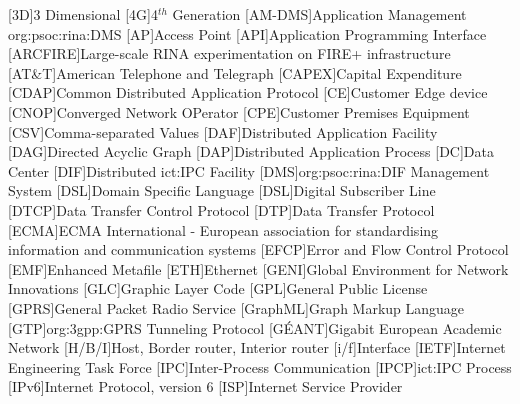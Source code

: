 \begin{acronym}[PRISTINEX]
    [3D]{3 Dimensional}
    [4G]{4$^{th}$ Generation}
    [AM-DMS]{Application Management \acs{org:psoc:rina:DMS}}
    [AP]{Access Point}
    [API]{Application Programming Interface}
    [ARCFIRE]{Large-scale RINA experimentation on FIRE+ infrastructure}
    [AT\&T]{American Telephone and Telegraph}
    [CAPEX]{Capital Expenditure}
    [CDAP]{Common Distributed Application Protocol}
    [CE]{Customer Edge device}
    [CNOP]{Converged Network OPerator}
    [CPE]{Customer Premises Equipment}
    [CSV]{Comma-separated Values}
    [DAF]{Distributed Application Facility}
    [DAG]{Directed Acyclic Graph}
    [DAP]{Distributed Application Process}
    [DC]{Data Center}
    [DIF]{Distributed \acs{ict:IPC} Facility}
    [DMS]{\acs{org:psoc:rina:DIF} Management System}
    [DSL]{Domain Specific Language}
    [DSL]{Digital Subscriber Line}
    [DTCP]{Data Transfer Control Protocol}
    [DTP]{Data Transfer Protocol}
    [ECMA]{ECMA International - European association for standardising information and communication systems}
    [EFCP]{Error and Flow Control Protocol}
    [EMF]{Enhanced Metafile}
    [ETH]{Ethernet}
    [GENI]{Global Environment for Network Innovations}
    [GLC]{Graphic Layer Code}
    [GPL]{General Public License}
    [GPRS]{General Packet Radio Service}
    [GraphML]{Graph Markup Language}
    [GTP]{\acs{org:3gpp:GPRS} Tunneling Protocol}
    [GÉANT]{Gigabit European Academic Network}
    [H/B/I]{Host, Border router, Interior router}
    [i/f]{Interface}
    [IETF]{Internet Engineering Task Force}
    [IPC]{Inter-Process Communication}
    [IPCP]{\acs{ict:IPC} Process}
    [IPv6]{Internet Protocol, version 6}
    [ISP]{Internet Service Provider}

\end{acronym}
